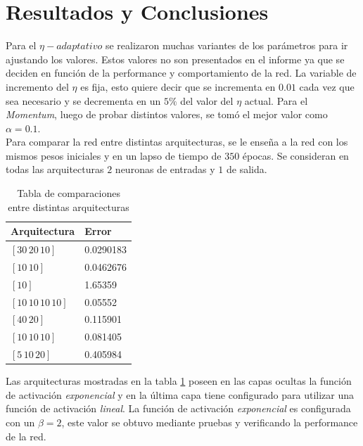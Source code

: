 \documentclass{sig-alternate}
\begin{document}
\section*{Resultados y Conclusiones}

	Para el $\eta-adaptativo$ se realizaron muchas variantes de los parámetros para ir ajustando los valores. Estos valores no son presentados en el informe ya que se deciden en función de la performance y comportamiento de la red. La variable de incremento del $\eta$ es fija, esto quiere decir que se incrementa en $0.01$ cada vez que sea necesario y se decrementa en un $5\%$ del valor del $\eta$ actual. Para el \textit{Momentum}, luego de probar distintos valores, se tomó el mejor valor como $\alpha = 0.1$. \\
	Para comparar la red entre distintas arquitecturas, se le enseña a la red con los mismos pesos iniciales y en un lapso de tiempo de $350$ épocas. Se consideran en todas las arquitecturas $2$ neuronas de entradas y $1$ de salida.\\

	\begin{table}[h]
		\begin{center}
			\begin{tabular}{ | p{2cm} | p{1.5cm} | }
				\hline
				Arquitectura & Error \\ \hline
				$[30\,20\,10]$ & 0.0290183  \\ 
				\hline
				$[10\,10]$ & 0.0462676  \\ 
				\hline
				$[10]$ & 1.65359  \\ 
				\hline
				$[10\,10\,10\,10]$ & 0.05552  \\ 
				\hline
				$[40\,20]$ & 0.115901  \\ 
				\hline
				$[10\,10\,10]$ & 0.081405  \\ 
				\hline
				$[5\,10\,20]$ & 0.405984  \\ 
				\hline	
			\end{tabular}
			\caption{Tabla de comparaciones entre distintas arquitecturas}	
			\label{t:arquis}
		\end{center}
	\end{table}

	Las arquitecturas mostradas en la tabla \ref{t:arquis} poseen en las capas ocultas la función de activación \textit{exponencial} y en la última capa tiene configurado para utilizar una función de activación \textit{lineal}. La función de activación \textit{exponencial} es configurada con un $\beta = 2$, este valor se obtuvo mediante pruebas y verificando la performance de la red. \\
\end{document}
